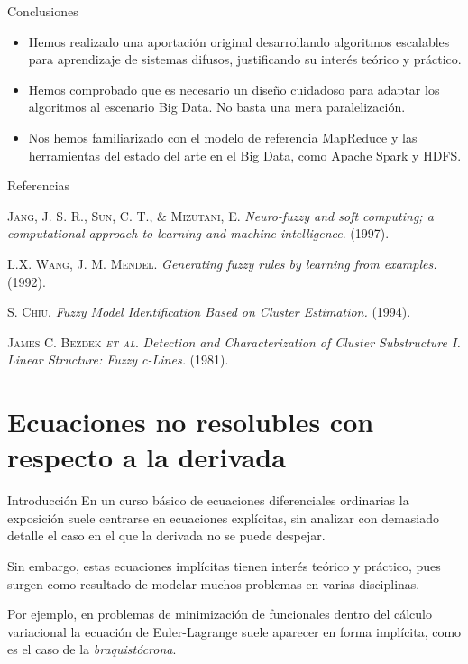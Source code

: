 \documentclass[10pt, spanish]{beamer}
\begin{document}
\begin{frame}{Conclusiones}
    \begin{itemize}
      \item Hemos realizado una aportación original desarrollando algoritmos escalables para aprendizaje de sistemas difusos, justificando su interés teórico y práctico.
      \item Hemos comprobado que es necesario un diseño cuidadoso para adaptar los algoritmos al escenario Big Data. No basta una mera paralelización.
      \item Nos hemos familiarizado con el modelo de referencia MapReduce y las herramientas del estado del arte en el Big Data, como Apache Spark y HDFS.
    \end{itemize}
\end{frame}

\begin{frame}{Referencias}
\begin{thebibliography}{9}

  \textsc{Jang, J. S. R., Sun, C. T., \& Mizutani, E}. \textit{Neuro-fuzzy and soft computing; a computational approach to learning and machine intelligence}. (1997).

\textsc{L.X. Wang, J. M. Mendel}. \textit{Generating fuzzy rules by learning from examples.} (1992).

\textsc{S. Chiu}. \textit{Fuzzy Model Identification Based on Cluster Estimation.} (1994).

\textsc{James C. Bezdek \textit{et al}}. \textit{Detection and Characterization of Cluster Substructure I. Linear Structure: Fuzzy c-Lines.} (1981).


\end{thebibliography}
\end{frame}

\section{Ecuaciones no resolubles con respecto a la derivada}


\begin{frame}{Introducción}
En un curso básico de ecuaciones diferenciales ordinarias la exposición suele centrarse en ecuaciones explícitas, sin analizar con demasiado detalle el caso en el que la derivada no se puede despejar.

Sin embargo, estas ecuaciones implícitas tienen interés teórico y práctico, pues surgen como resultado de modelar muchos problemas en varias disciplinas.

Por ejemplo, en problemas de minimización de funcionales dentro del cálculo variacional la ecuación de Euler-Lagrange suele aparecer en forma implícita, como es el caso de la \textit{braquistócrona}.
\end{frame}
\end{document}
